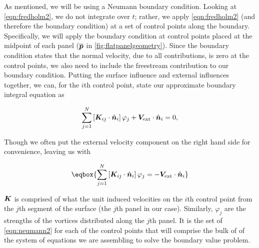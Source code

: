As mentioned, we will be using a Neumann boundary condition.
%
Looking at \cref{eqn:fredholm2}, we do not integrate over \(t\); rather, we apply \cref{eqn:fredholm2} (and therefore the boundary condition) at a set of control points along the boundary.
%
%
%
%
Specifically, we will apply the boundary condition at control points placed at the midpoint of each panel (\(\overline{\bm{p}}\) in \cref{fig:flatpanelgeometry}).
%
Since the boundary condition states that the normal velocity, due to all contributions, is zero at the control points, we also need to include the freestream contribution to our boundary condition.
%
Putting the surface influence and external influences together, we can, for the \(i\)th control point, state our approximate boundary integral equation as

\begin{equation}
    \label{eqn:neumanndiscrete}
    \sum_{j=1}^N \left[ \bm{K}_{ij} \cdot \hat{\bm{n}}_i \right]\varphi_j + \bm{V}_\text{ext} \cdot \hat{\bm{n}}_i = 0,
\end{equation}

\noindent Though we often put the external velocity component on the right hand side for convenience, leaving us with

\begin{equation}
    \label{eqn:neumann2}
    \eqbox{
    \sum_{j=1}^N \left[\vect{K}_{ij}\cdot \hat{\vect{n}}_i \right] \varphi_j= -\vect{V}_\text{ext} \cdot \hat{\vect{n}}_i
}
\end{equation}

\where \(\bm{K}\) is comprised of what the unit induced velocities on the \(i\)th control point from the \(j\)th segment of the surface (the \(j\)th panel in our case).
%
Similarly, \(\varphi_j\) are the strengths of the vortices distributed along the \(j\)th panel.
%
It is the set of \cref{eqn:neumann2} for each of the control points that will comprise the bulk of of the system of equations we are assembling to solve the boundary value problem.

